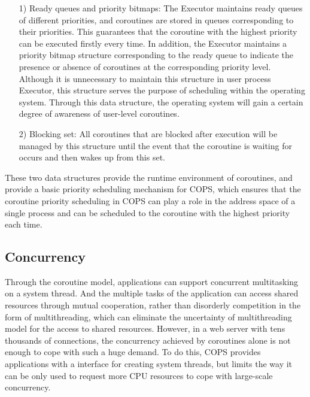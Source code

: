 \documentclass[sigconf,review,anonymous]{acmart}
\begin{document}
\begin{itemize}[leftmargin=*]
    \item[1)] Ready queues and priority bitmaps: The Executor maintains ready queues of different priorities, and coroutines are stored in queues corresponding to their priorities. This guarantees that the coroutine with the highest priority can be executed firstly every time. In addition, the Executor maintains a priority bitmap structure corresponding to the ready queue to indicate the presence or absence of coroutines at the corresponding priority level. Although it is unnecessary to maintain this structure in user process Executor, this structure serves the purpose of scheduling within the operating system. Through this data structure, the operating system will gain a certain degree of awareness of user-level coroutines.
    \item[2)] Blocking set: All coroutines that are blocked after execution will be managed by this structure until the event that the coroutine is waiting for occurs and then wakes up from this set.
\end{itemize}

These two data structures provide the runtime environment of coroutines, and provide a basic priority scheduling mechanism for COPS, which ensures that the coroutine priority scheduling in COPS can play a role in the address space of a single process and can be scheduled to the coroutine with the highest priority each time.

\subsection{Concurrency}
\label{section: Concurrency}

Through the coroutine model, applications can support concurrent multitasking on a system thread. And the multiple tasks of the application can access shared resources through mutual cooperation, rather than disorderly competition in the form of multithreading, which can eliminate the uncertainty of multithreading model for the access to shared resources. However, in a web server with tens thousands of connections, the concurrency achieved by coroutines alone is not enough to cope with such a huge demand. To do this, COPS provides applications with a interface for creating system threads, but limits the way it can be only used to request more CPU resources to cope with large-scale concurrency. 
\end{document}
